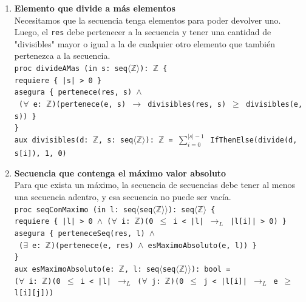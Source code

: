 \begin{enumerate}[label=\textbf{\alph*)}]
    \vspace{0.4cm}
    \item \textbf{Elemento que divide a más elementos} \\
    Necesitamos que la secuencia tenga elementos para poder devolver uno. Luego, el \texttt{res} debe pertenecer a la secuencia y tener una cantidad de "divisibles" mayor o igual a la de cualquier otro elemento que también pertenezca a la secuencia. \\
    \texttt{proc divideAMas (in s: seq$\langle\mathbb{Z}\rangle$): $\mathbb{Z}$ \{} \\
    \texttt{\hspace*{0.5cm}requiere \{ |s| > 0 \}} \\
    \texttt{\hspace*{0.5cm}asegura \{ pertenece(res, s) $\wedge$} \\
    \texttt{\hspace*{1.0cm} ($\forall$ e: $\mathbb{Z}$)(pertenece(e, s) $\rightarrow$ divisibles(res, s) $\geq$ divisibles(e, s)) \}} \\
    \texttt{\}} \\
    \texttt{aux divisibles(d: $\mathbb{Z}$, s: seq$\langle\mathbb{Z}\rangle$): $\mathbb{Z}$ = $\sum_{i=0}^{|s|-1}$ IfThenElse(divide(d, s[i]), 1, 0)}

    \vspace{0.4cm}
    \item \textbf{Secuencia que contenga el máximo valor absoluto} \\
    Para que exista un máximo, la secuencia de secuencias debe tener al menos una secuencia adentro, y esa secuencia no puede ser vacía. \\
    \texttt{proc seqConMaximo (in l: seq$\langle$seq$\langle\mathbb{Z}\rangle\rangle$): seq$\langle\mathbb{Z}\rangle$ \{} \\
    \texttt{\hspace*{0.5cm}requiere \{ |l| > 0 $\wedge$ ($\forall$ i: $\mathbb{Z}$)(0 $\leq$ i < |l| $\rightarrow_L$ |l[i]| > 0) \}} \\
    \texttt{\hspace*{0.5cm}asegura \{ perteneceSeq(res, l) $\wedge$} \\
    \texttt{\hspace*{1.0cm} ($\exists$ e: $\mathbb{Z}$)(pertenece(e, res) $\wedge$ esMaximoAbsoluto(e, l)) \}} \\
    \texttt{\}} \\
    \texttt{aux esMaximoAbsoluto(e: $\mathbb{Z}$, l: seq$\langle$seq$\langle\mathbb{Z}\rangle\rangle$): bool =} \\
    \texttt{\hspace*{0.5cm}($\forall$ i: $\mathbb{Z}$)(0 $\leq$ i < |l| $\rightarrow_L$ ($\forall$ j: $\mathbb{Z}$)(0 $\leq$ j < |l[i]| $\rightarrow_L$ e $\geq$ l[i][j]))}


\end{enumerate}
